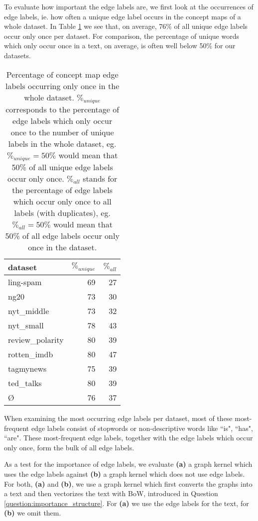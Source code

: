 To evaluate how important the edge labels are, we first look at the occurrences of edge labels, ie. how often a unique edge label occurs in the concept maps of a whole dataset.
In Table \ref{table:edge_label_occurrences} we see that, on average, 76\% of all unique edge labels occur only once per dataset. For comparison, the percentage of unique words which only occur once in a text, on average, is often well below 50\% for our datasets.

\begin{table}[htb!]
    \centering
    \begin{tabular}{lrr}
\toprule
        dataset &  $ \%_{unique} $ & $ \%_{all}$  \\
        \midrule
        ling-spam       & 69 & 27 \\
        ng20            & 73 & 30 \\
        nyt\_middle      & 73 & 32 \\
        nyt\_small       & 78 & 43 \\
        review\_polarity & 80 & 39 \\
        rotten\_imdb     & 80 & 47 \\
        tagmynews       & 75 & 39 \\
        ted\_talks       & 80 & 39 \\
        \midrule
        \O           & 76 & 37 \\
        \bottomrule
    \end{tabular}
    \caption[Statistics: Percentage of concept map labels occurring once]{Percentage of concept map edge labels occurring only once in the whole dataset.
        $ \%_{unique} $ corresponds to the percentage of edge labels which only occur once to the number of unique labels in the whole dataset, eg. $ \%_{unique} = 50\% $ would mean that 50\% of all unique edge labels occur only once.
        $ \%_{all}$ stands for the percentage of edge labels which occur only once to all labels (with duplicates), eg. $ \%_{all} = 50\%$ would mean that 50\% of all edge labels occur only once in the dataset.}\label{table:edge_label_occurrences}
\end{table}

When examining the most occurring edge labels per dataset, most of these most-frequent edge labels consist of stopwords or non-descriptive words like ``is", ``has", ``are".
These most-frequent edge labels, together with the edge labels which occur only once, form the bulk of all edge labels.

As a test for the importance of edge labels, we evaluate \textbf{(a)} a graph kernel which uses the edge labels against \textbf{(b)} a graph kernel which does not use edge labels.
For both, \textbf{(a)} and \textbf{(b)}, we use a graph kernel which first converts the graphs into a text and then vectorizes the text with BoW, introduced in Question \ref{question:importance_structure}.
For \textbf{(a)} we use the edge labels for the text, for \textbf{(b)} we omit them.

